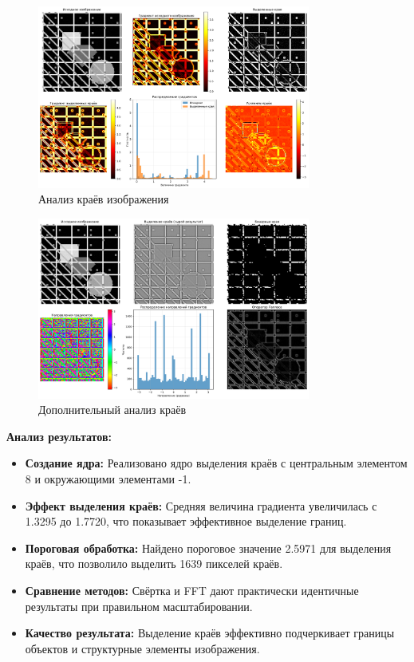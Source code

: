 \begin{figure}[H]
    \centering
    \includegraphics[width=0.8\textwidth]{images/task4/edge_analysis.png}
    \caption{Анализ краёв изображения}
    \label{fig:edge_analysis}
\end{figure}

\begin{figure}[H]
    \centering
    \includegraphics[width=0.8\textwidth]{images/task4/additional_edge_analysis.png}
    \caption{Дополнительный анализ краёв}
    \label{fig:additional_edge_analysis}
\end{figure}

\textbf{Анализ результатов:}
\begin{itemize}
    \item \textbf{Создание ядра:} Реализовано ядро выделения краёв с центральным элементом 8 и окружающими элементами -1.
    
    \item \textbf{Эффект выделения краёв:} Средняя величина градиента увеличилась с 1.3295 до 1.7720, что показывает эффективное выделение границ.
    
    \item \textbf{Пороговая обработка:} Найдено пороговое значение 2.5971 для выделения краёв, что позволило выделить 1639 пикселей краёв.
    
    \item \textbf{Сравнение методов:} Свёртка и FFT дают практически идентичные результаты при правильном масштабировании.
    
    \item \textbf{Качество результата:} Выделение краёв эффективно подчеркивает границы объектов и структурные элементы изображения.
\end{itemize}

